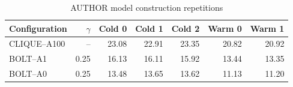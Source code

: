 \begin{table}[H]
\centering
\small
\setlength{\tabcolsep}{5pt}
\caption{AUTHOR model construction repetitions}
\label{tab:E_repetitions_AUTHOR}
\begin{tabular}{@{}lrrrrrr@{}}
\toprule
Configuration & $\gamma$ & Cold 0 & Cold 1 & Cold 2 & Warm 0 & Warm 1 \\
\midrule
CLIQUE--A100 & -- & 23.08 & 22.91 & 23.35 & 20.82 & 20.92 \\
BOLT--A1 & 0.25 & 16.13 & 16.11 & 15.92 & 13.44 & 13.35 \\
BOLT--A0 & 0.25 & 13.48 & 13.65 & 13.62 & 11.13 & 11.20 \\
\bottomrule
\end{tabular}
\end{table}
